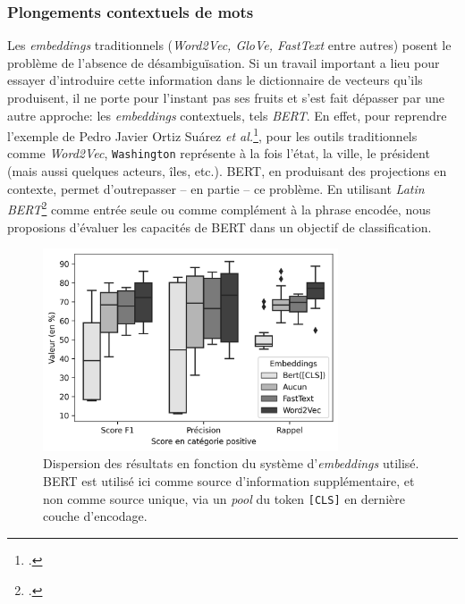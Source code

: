 \subsubsection{Plongements contextuels de mots}

Les \textit{embeddings} traditionnels (\textit{Word2Vec, GloVe, FastText} entre autres) posent le problème de l'absence de désambiguïsation. Si un travail important a lieu pour essayer d'introduire cette information dans le dictionnaire de vecteurs qu'ils produisent, il ne porte pour l'instant pas ses fruits et s'est fait dépasser par une autre approche: les \textit{embeddings} contextuels, tels \textit{BERT}. En effet, pour reprendre l'exemple de Pedro Javier Ortiz Suárez \textit{et al.}\footcite{ortizsuarez:hal02148693}, pour les outils traditionnels comme \textit{Word2Vec}, \texttt{Washington} représente à la fois l'état, la ville, le président (mais aussi quelques acteurs, îles, etc.). BERT, en produisant des projections en contexte, permet d'outrepasser -- en partie -- ce problème. En utilisant \textit{Latin BERT}\footcite{bamman2020latin} comme entrée seule ou comme complément à la phrase encodée, nous proposions d'évaluer les capacités de BERT dans un objectif de classification.

\begin{figure}[t]
    \centering
    \includegraphics[height=6cm]{figures/chap4/scoreDispersionEmbeddings.png}
    \caption{Dispersion des résultats en fonction du système d'\textit{embeddings} utilisé. BERT est utilisé ici comme source  d'information supplémentaire, et non comme source unique, via un \textit{pool} du token \texttt{[CLS]} en dernière couche d'encodage.}
    \label{fig:chap4:bert-dispersion-fusion}
\end{figure}

